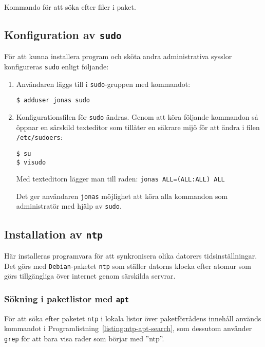 \begin{listing}[H]
\caption{Kommando för att söka efter filer i paket.}
\label{listing:dpkg-search}
\end{listing}


\subsection{Konfiguration av \texttt{sudo}}
För att kunna installera program och sköta andra administrativa sysslor
konfigureras \texttt{sudo} enligt följande:

\begin{enumerate}
  \item Användaren läggs till i \texttt{sudo}-gruppen med kommandot:

        \texttt{\$ adduser jonas sudo}

  \item Konfigurationsfilen för \texttt{sudo} ändras. Genom att köra
        följande kommandon så öppnar en särskild texteditor som tillåter en
        säkrare mijö för att ändra i filen \texttt{/etc/sudoers}:
        
        \texttt{\$ su} \\
        \texttt{\$ visudo}

        Med texteditorn lägger man till raden:
        \texttt{jonas ALL=(ALL:ALL) ALL}

        Det ger användaren \texttt{jonas} möjlighet att köra alla kommandon som 
        administratör med hjälp av \texttt{sudo}.
\end{enumerate}


\subsection{Installation av \texttt{ntp}}
Här installeras programvara för att synkronisera olika datorers
tidsinställningar.  Det görs med \texttt{Debian}-paketet \texttt{ntp} som
ställer datorns klocka efter atomur som görs tillgängliga över internet genom
särskilda servrar.


\subsubsection{Sökning i paketlistor med \texttt{apt}}
För att söka efter paketet \texttt{ntp} i lokala listor över paketförrådens
innehåll används kommandot i Programlistning~\ref{listing:ntp-apt-search},
som dessutom använder \texttt{grep} för att bara visa rader som börjar med
''ntp''.

